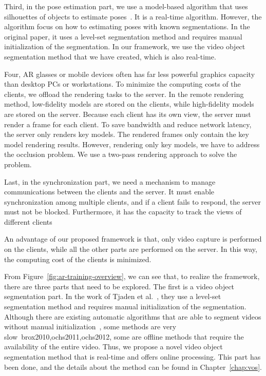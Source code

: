 Third, in the pose estimation part, we use a model-based algorithm that uses silhouettes of objects to estimate poses~\cite{tjaden2016}.
It is a real-time algorithm.
However, the algorithm focus on how to estimating poses with known segmentations. In the original paper, it uses a level-set segmentation method and requires manual initialization of the segmentation.
In our framework, we use the video object segmentation method that we have created, which is also real-time.

Four, AR glasses or mobile devices often has far less powerful graphics capacity than desktop PCs or workstations.
To minimize the computing costs of the clients, we offload the rendering tasks to the server.
In the remote rendering method, low-fidelity models are stored on the clients, while high-fidelity models are stored on the server.
Because each client has its own view, the server must render a frame for each client.
To save bandwidth and reduce network latency, the server only renders key models. The rendered frames only contain the key model rendering results.
However, rendering only key models, we have to address the occlusion problem. We use a two-pass rendering approach to solve the problem.

Last, in the synchronization part, we need a mechanism to manage communications between the clients and the server.
It must enable synchronization among multiple clients, and if a client fails to respond, the server must not be blocked.
Furthermore, it has the capacity to track the views of different clients

An advantage of our proposed framework is that, only video capture is performed on the clients, while all the other parts are performed on the server.
In this way, the computing cost of the clients is minimized.

From Figure~\ref{fig:ar-training-overview}, we can see that, to realize the framework, there are three parts that need to be explored.
The first is a video object segmentation part. In the work of Tjaden et al.~\cite{tjaden2016}, they use a level-set segmentation method and requires manual initialization of the segmentation.
Although there are existing automatic algorithms that are able to segment videos without manual initialization~\cite{brox2010,ochs2011,ochs2012,papazoglou2013,wang2015}, some methods are very slow~{brox2010,ochs2011,ochs2012}, some are offline methods that require the availability of the entire video.
Thus, we propose a novel video object segmentation method that is real-time and offers online processing.
This part has been done, and the details about the method can be found in Chapter~\ref{chap:vos}.

